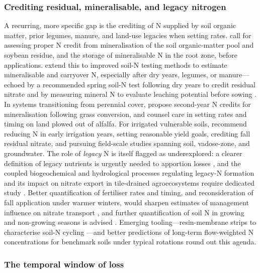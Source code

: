 \documentclass[11pt]{article}
\begin{document}
\subsubsection{Crediting residual, mineralisable, and legacy nitrogen}

A recurring, more specific gap is the crediting of N supplied by soil organic matter, prior legumes, manure, and land-use legacies when setting rates. \textcite{Bakhsh2007,Bakhsh2005} call for assessing proper N credit from mineralisation of the soil organic-matter pool and soybean residue, and the storage of mineralisable N in the root zone, before applications. \textcite{Randall2001} extend this to improved soil-N testing methods to estimate mineralisable and carryover N, especially after dry years, legumes, or manure---echoed by a recommended spring soil-N test following dry years to credit residual nitrate \parencite{RANDALL1995} and by measuring mineral N to evaluate leaching potential before sowing \parencite{Conrad2009}. In systems transitioning from perennial cover, \textcite{Huggins2001} propose second-year N credits for mineralisation following grass conversion, and \textcite{ROBBINS1980} counsel care in setting rates and timing on land plowed out of alfalfa. For irrigated vulnerable soils, \textcite{Derby2009} recommend reducing N in early irrigation years, setting reasonable yield goals, crediting fall residual nitrate, and pursuing field-scale studies spanning soil, vadose-zone, and groundwater. The role of \emph{legacy} N is itself flagged as underexplored: a clearer definition of legacy nutrients is urgently needed to apportion losses \parencite{Williams2022}, and the coupled biogeochemical and hydrological processes regulating legacy-N formation and its impact on nitrate export in tile-drained agroecosystems require dedicated study \parencite{Hu2024}. Better quantification of fertiliser rates and timing, and reconsideration of fall application under warmer winters, would sharpen estimates of management influence on nitrate transport \parencite{Gentry2014}, and further quantification of soil N in growing and non-growing seasons is advised \parencite{Bosompemaa2021}. Emerging tooling---resin-membrane strips to characterise soil-N cycling \parencite{Masri2024}---and better predictions of long-term flow-weighted N concentrations for benchmark soils under typical rotations \parencite{Skaggs2012} round out this agenda.

\subsubsection{The temporal window of loss}
\end{document}
